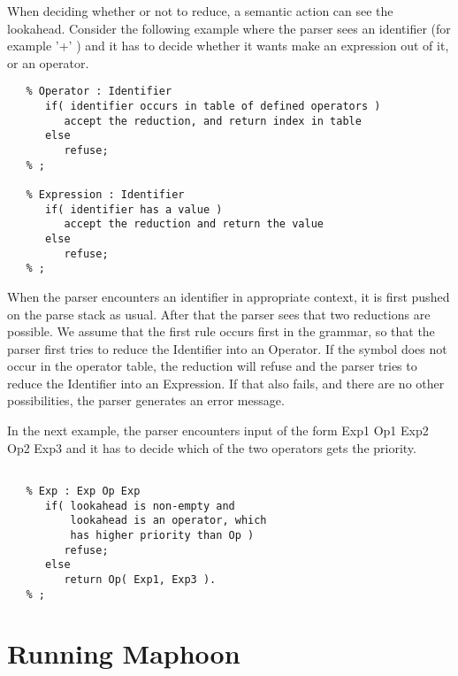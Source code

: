 \documentclass{article}
\begin{document}
\begin{enumerate}
   \noindent
   When deciding whether or not to reduce, a semantic action 
   can see the lookahead.
   Consider the following example where the parser sees an identifier 
   (for example
   '+' ) and it has to decide whether it wants make an expression out 
   of it, or an operator.
\begin{verbatim}
   % Operator : Identifier 
      if( identifier occurs in table of defined operators )
         accept the reduction, and return index in table
      else
         refuse;
   % ;

   % Expression : Identifier  
      if( identifier has a value )
         accept the reduction and return the value
      else
         refuse;
   % ;

\end{verbatim}
   When the parser encounters an identifier in appropriate context, 
   it is first pushed on the parse stack as usual. 
   After that the parser sees that two reductions are possible. 
   We assume that the first
   rule occurs first in the grammar, so that the parser first tries to 
   reduce the Identifier into an Operator.
   If the symbol does not occur in the operator table, the reduction 
   will refuse
   and the parser tries to reduce the Identifier into an Expression.
   If that also fails, and there are no other possibilities, the parser
   generates an error message. 

   \noindent
   In the next example, the parser encounters input of the form
   Exp1 Op1 Exp2 Op2 Exp3 and it has to decide which of the two
   operators gets the priority.
\begin{verbatim}

   % Exp : Exp Op Exp 
      if( lookahead is non-empty and
          lookahead is an operator, which 
          has higher priority than Op ) 
         refuse;
      else
         return Op( Exp1, Exp3 ).
   % ;

\end{verbatim}
   
\end{enumerate} 

\section{Running Maphoon}
\end{document}
